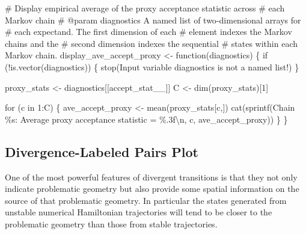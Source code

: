 \documentclass[
  letterpaper,
  DIV=11,
  numbers=noendperiod]{scrartcl}
\newenvironment{Shaded}{\begin{snugshade}}{\end{snugshade}}
\newcommand{\CharTok}[1]{\textcolor[rgb]{0.13,0.47,0.30}{#1}}
\newcommand{\CommentTok}[1]{\textcolor[rgb]{0.37,0.37,0.37}{#1}}
\newcommand{\ControlFlowTok}[1]{\textcolor[rgb]{0.00,0.23,0.31}{#1}}
\newcommand{\DecValTok}[1]{\textcolor[rgb]{0.68,0.00,0.00}{#1}}
\newcommand{\KeywordTok}[1]{\textcolor[rgb]{0.00,0.23,0.31}{#1}}
\newcommand{\NormalTok}[1]{\textcolor[rgb]{0.00,0.23,0.31}{#1}}
\newcommand{\OperatorTok}[1]{\textcolor[rgb]{0.37,0.37,0.37}{#1}}
\newcommand{\SpecialCharTok}[1]{\textcolor[rgb]{0.37,0.37,0.37}{#1}}
\newcommand{\StringTok}[1]{\textcolor[rgb]{0.13,0.47,0.30}{#1}}
\begin{document}
\begin{Shaded}
\begin{Highlighting}[]
\CommentTok{\# Display empirical average of the proxy acceptance statistic across }
\CommentTok{\# each Markov chain}
\CommentTok{\# @param diagnostics A named list of two{-}dimensional arrays for }
\CommentTok{\#                    each expectand.  The first dimension of each}
\CommentTok{\#                    element indexes the Markov chains and the }
\CommentTok{\#                    second dimension indexes the sequential }
\CommentTok{\#                    states within each Markov chain.}
\NormalTok{display\_ave\_accept\_proxy }\OperatorTok{\textless{}{-}}\NormalTok{ function(diagnostics) \{}
  \ControlFlowTok{if}\NormalTok{ (}\OperatorTok{!}\KeywordTok{is}\NormalTok{.vector(diagnostics)) \{}
\NormalTok{    stop(}\StringTok{\textquotesingle{}Input variable \textasciigrave{}diagnostics\textasciigrave{} is not a named list!\textquotesingle{}}\NormalTok{)}
\NormalTok{  \}}
  
\NormalTok{  proxy\_stats }\OperatorTok{\textless{}{-}}\NormalTok{ diagnostics[[}\StringTok{\textquotesingle{}accept\_stat\_\_\textquotesingle{}}\NormalTok{]]}
\NormalTok{  C }\OperatorTok{\textless{}{-}}\NormalTok{ dim(proxy\_stats)[}\DecValTok{1}\NormalTok{]}

  \ControlFlowTok{for}\NormalTok{ (c }\KeywordTok{in} \DecValTok{1}\NormalTok{:C) \{}
\NormalTok{    ave\_accept\_proxy }\OperatorTok{\textless{}{-}}\NormalTok{ mean(proxy\_stats[c,])}
\NormalTok{    cat(sprintf(}\StringTok{\textquotesingle{}Chain }\SpecialCharTok{\%s}\StringTok{: Average proxy acceptance statistic = }\SpecialCharTok{\%.3f}\CharTok{\textbackslash{}n}\StringTok{\textquotesingle{}}\NormalTok{,}
\NormalTok{                c, ave\_accept\_proxy))}
\NormalTok{  \}}
\NormalTok{\}}
\end{Highlighting}
\end{Shaded}

\subsection{Divergence-Labeled Pairs
Plot}\label{divergence-labeled-pairs-plot}

One of the most powerful features of divergent transitions is that they
not only indicate problematic geometry but also provide some spatial
information on the source of that problematic geometry. In particular
the states generated from unstable numerical Hamiltonian trajectories
will tend to be closer to the problematic geometry than those from
stable trajectories.
\end{document}
